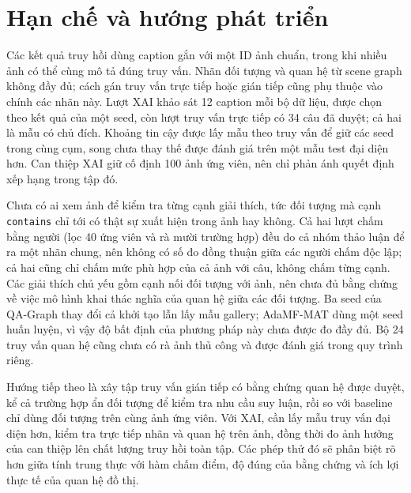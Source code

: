 \section{Hạn chế và hướng phát triển}\label{sec:limit}
Các kết quả truy hồi dùng caption gắn với một ID ảnh chuẩn, trong khi nhiều ảnh có thể cùng mô tả đúng truy vấn. Nhãn đối tượng và quan hệ từ scene graph không đầy đủ; cách gán truy vấn trực tiếp hoặc gián tiếp cũng phụ thuộc vào chính các nhãn này. Lượt XAI khảo sát 12 caption mỗi bộ dữ liệu, được chọn theo kết quả của một seed, còn lượt truy vấn trực tiếp có 34 câu đã duyệt; cả hai là mẫu có chủ đích. Khoảng tin cậy được lấy mẫu theo truy vấn để giữ các seed trong cùng cụm, song chưa thay thế được đánh giá trên một mẫu test đại diện hơn. Can thiệp XAI giữ cố định 100 ảnh ứng viên, nên chỉ phản ánh quyết định xếp hạng trong tập đó.

Chưa có ai xem ảnh để kiểm tra từng cạnh giải thích, tức đối tượng mà cạnh \texttt{contains} chỉ tới có thật sự xuất hiện trong ảnh hay không. Cả hai lượt chấm bằng người (lọc 40 ứng viên và rà mười trường hợp) đều do cả nhóm thảo luận để ra một nhãn chung, nên không có số đo đồng thuận giữa các người chấm độc lập; cả hai cũng chỉ chấm mức phù hợp của cả ảnh với câu, không chấm từng cạnh. Các giải thích chủ yếu gồm cạnh nối đối tượng với ảnh, nên chưa đủ bằng chứng về việc mô hình khai thác nghĩa của quan hệ giữa các đối tượng. Ba seed của QA-Graph thay đổi cả khởi tạo lẫn lấy mẫu gallery; AdaMF-MAT dùng một seed huấn luyện, vì vậy độ bất định của phương pháp này chưa được đo đầy đủ. Bộ 24 truy vấn quan hệ cũng chưa có rà ảnh thủ công và được đánh giá trong quy trình riêng.

Hướng tiếp theo là xây tập truy vấn gián tiếp có bằng chứng quan hệ được duyệt, kể cả trường hợp ẩn đối tượng để kiểm tra nhu cầu suy luận, rồi so với baseline chỉ dùng đối tượng trên cùng ảnh ứng viên. Với XAI, cần lấy mẫu truy vấn đại diện hơn, kiểm tra trực tiếp nhãn và quan hệ trên ảnh, đồng thời đo ảnh hưởng của can thiệp lên chất lượng truy hồi toàn tập. Các phép thử đó sẽ phân biệt rõ hơn giữa tính trung thực với hàm chấm điểm, độ đúng của bằng chứng và ích lợi thực tế của quan hệ đồ thị.
